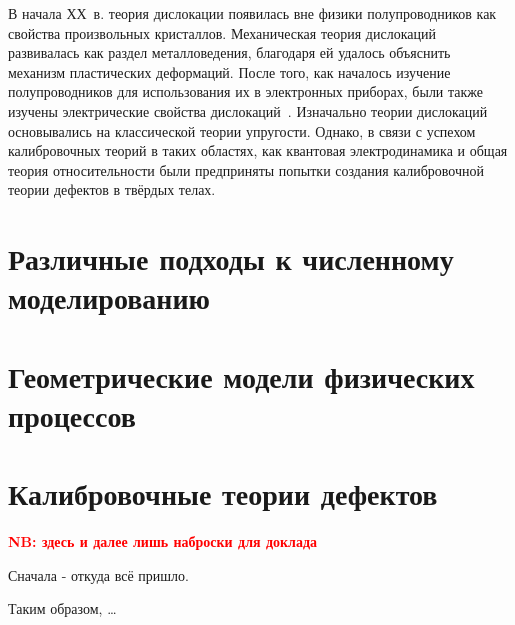 \documentclass[a4paper, 14pt, titlepage]{extarticle}
\begin{document}

  В начала ХХ~в. теория дислокации появилась вне физики полупроводников как свойства произвольных
  кристаллов. Механическая теория дислокаций развивалась как раздел металловедения, благодаря ей
  удалось объяснить механизм пластических деформаций. После того, как началось изучение
  полупроводников для использования их в электронных приборах, были также изучены электрические
  свойства дислокаций~\cite{matare-defects}. Изначально теории дислокаций основывались на
  классической теории упругости. Однако, в связи с успехом калибровочных теорий в таких областях,
  как квантовая электродинамика и общая теория относительности были предприняты попытки создания
  калибровочной теории дефектов в твёрдых телах.

  \section{Различные подходы к численному моделированию}

  \section{Геометрические модели физических процессов}

  \section{Калибровочные теории дефектов}

  \textbf{\textcolor{red}{\large NB: здесь и далее лишь наброски для доклада}}

  Сначала - откуда всё пришло.


  Таким образом, \dots

  \PrintBibliography
\end{document}
